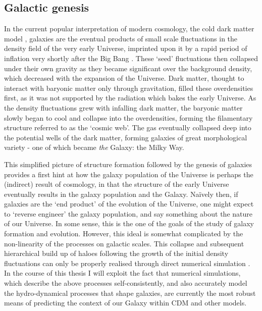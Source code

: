 \subsection{Galactic genesis}

In the current popular interpretation of modern cosmology, the cold dark matter model \citep[CDM, e.g.][]{1978MNRAS.183..341W}, galaxies are the eventual products of small scale fluctuations in the density field of the very early Universe, imprinted upon it by a rapid period of inflation very shortly after the Big Bang \citep{guth1981inflationary}. These `seed' fluctuations then collapsed under their own gravity as they became significant over the background density, which decreased with the expansion of the Universe. Dark matter, thought to interact with baryonic matter only through gravitation, filled these overdensities first, as it was not supported by the radiation which bakes the early Universe. As the density fluctuations grew with infalling dark matter, the baryonic matter slowly began to cool and collapse into the overdensities, forming the filamentary structure referred to as the `cosmic web'. The gas eventually collapsed deep into the potential wells of the dark matter, forming galaxies of great morphological variety - one of which became \emph{the} Galaxy: the Milky Way.

This simplified picture of structure formation followed by the genesis of galaxies provides a first hint at how the galaxy population of the Universe is perhaps the (indirect) result of cosmology, in that the structure of the early Universe eventually results in the galaxy population and the Galaxy. Na\"ively then, if galaxies are the `end product' of the evolution of the Universe, one might expect to `reverse engineer' the galaxy population, and say something about the nature of our Universe. In some sense, this is the one of the goals of the study of galaxy formation and evolution. However, this ideal is somewhat complicated by the non-linearity of the processes on galactic scales. This collapse and subsequent hierarchical build up of haloes following the growth of the initial density fluctuations can only be properly realised through direct numerical simulation \citep[e.g.][]{2005Natur.435..629S}. In the course of this thesis I will exploit the fact that numerical simulations, which describe the above processes self-consistently, and also accurately model the hydro-dynamical processes that shape galaxies, are currently the most robust means of predicting the context of our Galaxy within CDM and other models.

